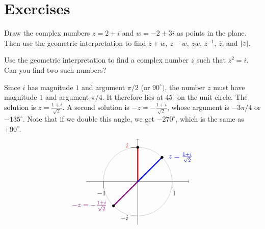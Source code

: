 \section*{Exercises}

\begin{ex}
  Draw the complex numbers $z = 2+i$ and $w = -2+3i$ as points in the
  plane. Then use the geometric interpretation to find $z+w$,
  $z-w$, $zw$, $z^{-1}$, $\overline{z}$, and $\left|z\right|$.
\end{ex}

\begin{ex}
  Use the geometric interpretation to find a complex number $z$ such
  that $z^2 = i$. Can you find two such numbers?
  \begin{sol}
    Since $i$ has magnitude $1$ and argument $\pi/2$ (or
    $90^{\circ})$, the number $z$ must have magnitude $1$ and argument
    $\pi/4$. It therefore lies at $45^{\circ}$ on the unit circle. The
    solution is $z=\frac{1+i}{\sqrt{2}}$. A second solution is
    $-z=-\frac{1+i}{\sqrt{2}}$, whose argument is $-3\pi/4$ or
    $-135^{\circ}$. Note that if we double this angle, we get
    $-270^{\circ}$, which is the same as $+90^{\circ}$.
    \begin{equation*}
      \begin{tikzpicture}[scale=1.7]
        \draw[black!30] (0,0) circle (1);
        \draw[->](-1.5,0) -- (1.5,0);
        \draw[->](0,-1.25) -- (0,1.25);
        \draw(0,-1) -- +(-0.2,0) node[left,yshift=-3pt] {$-i$};
        \draw(0,1) -- +(-0.2,0) node[left,yshift=3pt,red] {$i$};
        \draw(-1,0) -- +(0,-0.2) node[below,xshift=-3pt] {$-1$};
        \draw(1,0) -- +(0,-0.2) node[below,xshift=3pt] {$1$};
        \draw[ultra thick, red] (0,0) -- (90:1);
        \draw[ultra thick, blue] (0,0) -- (45:1);
        \draw[ultra thick, purple!70!blue] (0,0) -- (225:1);
        \draw[fill, black] (45:1) circle [radius=1.06pt] node [right=2mm, blue] {$z = \frac{1+i}{\sqrt{2}}$};
        \draw[fill, black] (225:1) circle [radius=1.06pt] node [left=2mm, purple!70!blue] {$-z = -\frac{1+i}{\sqrt{2}}$};
        \draw[fill, black] (90:1) circle [radius=1.06pt];
      \end{tikzpicture}
    \end{equation*}
  \end{sol}
\end{ex}

